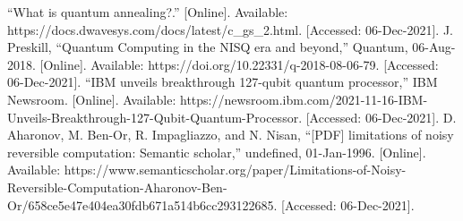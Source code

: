 \documentclass[conference]{IEEEtran}
\begin{document}
\begin{thebibliography}{00}
 “What is quantum annealing?.” [Online]. Available: https://docs.dwavesys.com/docs/latest/c\_gs\_2.html. [Accessed: 06-Dec-2021]. 
 J. Preskill, “Quantum Computing in the NISQ era and beyond,” Quantum, 06-Aug-2018. [Online]. Available: https://doi.org/10.22331/q-2018-08-06-79. [Accessed: 06-Dec-2021].
 “IBM unveils breakthrough 127-qubit quantum processor,” IBM Newsroom. [Online]. Available: https://newsroom.ibm.com/2021-11-16-IBM-Unveils-Breakthrough-127-Qubit-Quantum-Processor. [Accessed: 06-Dec-2021]. 
 D. Aharonov, M. Ben-Or, R. Impagliazzo, and N. Nisan, “[PDF] limitations of noisy reversible computation: Semantic scholar,” undefined, 01-Jan-1996. [Online]. Available: https://www.semanticscholar.org/paper/Limitations-of-Noisy-Reversible-Computation-Aharonov-Ben-Or/658ce5e47e404ea30fdb671a514b6cc293122685. [Accessed: 06-Dec-2021]. 
\end{thebibliography}
\end{document}
